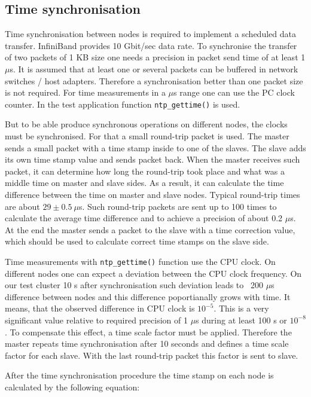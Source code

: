\subsection{Time synchronisation}

Time synchronisation between nodes is required to implement a scheduled data transfer. 
InfiniBand provides 10 Gbit/sec data rate. To synchronise the transfer of two packets of 1 KB size
one needs a precision in packet send time of at least 1 $\mu$s. 
It is assumed that at least one or several packets can be buffered in network switches / host adapters.
Therefore a synchronisation better than one packet size is not required. 
For time measurements in a $\mu$s range one can use the PC clock counter. 
In the test application function {\tt ntp\_gettime()} is used. 

But to be able produce synchronous operations on different nodes, the clocks must be synchronised.
For that a small round-trip packet is used. The master sends a small packet with a 
time stamp inside to one of the slaves.
The slave adds its own time stamp value and sends packet back. 
When the master receives such packet, it can determine how long the round-trip took place 
and what was a middle 
time on master and slave sides. As a result, it can calculate the
time difference between the time on master and slave nodes. 
Typical round-trip times are about $29\pm0.5~\mu$s. 
Such round-trip packets are sent up to 100 times to calculate the 
average time difference and to achieve a precision of about 0.2 $\mu$s.
At the end the master sends a packet to the slave with a time correction value, which should be
used to calculate correct time stamps on the slave side.

Time measurements with {\tt ntp\_gettime()} function use the CPU clock.
On different nodes one can expect a deviation between the CPU clock frequency.
On our test cluster 10 s after synchronisation such deviation leads to ~200 $\mu$s 
difference between nodes and 
this difference poportianally grows with time. 
It means, that the observed difference in CPU clock is $10^{-5}$.
This is a very significant value relative to required precision of 1 $\mu$s 
during at least 100 s or $10^{-8}$. 
To compensate this effect, a time scale factor must be applied. 
Therefore the master repeats time synchronisation after
10 seconds and defines a time scale factor for each slave. 
With the last round-trip packet this factor is sent to slave.

After the time synchronisation procedure the time stamp 
on each node is calculated by the following equation:


